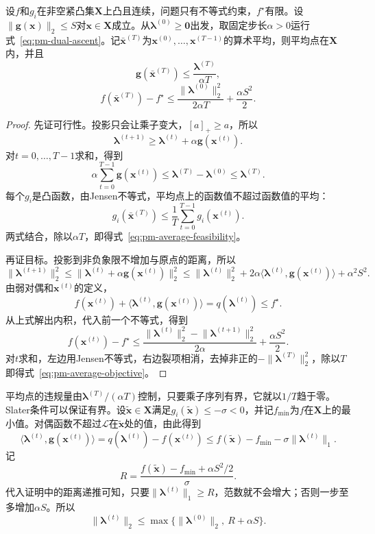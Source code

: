 \begin{theorem}[平均点的可行性与目标]
\label{thm:pm-primal-average}
设$f$和$g_i$在非空紧凸集$\bm{X}$上凸且连续，问题只有不等式约束，$f^\star$有限。设$\lVert\bm{g}(\bm{x})\rVert_2\leq S$对$\bm{x}\in\bm{X}$成立。从$\bm{\lambda}^{(0)}\geq\bm{0}$出发，取固定步长$\alpha>0$运行式~\eqref{eq:pm-dual-ascent}。记$\bar{\bm{x}}^{(T)}$为$\bm{x}^{(0)},\ldots,\bm{x}^{(T-1)}$的算术平均，则平均点在$\bm{X}$内，并且
\begin{equation}
 \bm{g}(\bar{\bm{x}}^{(T)})\leq\frac{\bm{\lambda}^{(T)}}{\alpha T},
 \label{eq:pm-average-feasibility}
\end{equation}
\begin{equation}
 f(\bar{\bm{x}}^{(T)})-f^\star\leq\frac{\lVert\bm{\lambda}^{(0)}\rVert_2^2}{2\alpha T}+\frac{\alpha S^2}{2}.
 \label{eq:pm-average-objective}
\end{equation}
\end{theorem}

\begin{proof}
先证可行性。投影只会让乘子变大，$[a]_+\geq a$，所以
\[
 \bm{\lambda}^{(t+1)}\geq\bm{\lambda}^{(t)}+\alpha\bm{g}(\bm{x}^{(t)}).
\]
对$t=0,\ldots,T-1$求和，得到
\[
 \alpha\sum_{t=0}^{T-1}\bm{g}(\bm{x}^{(t)})\leq\bm{\lambda}^{(T)}-\bm{\lambda}^{(0)}\leq\bm{\lambda}^{(T)}.
\]
每个$g_i$是凸函数，由Jensen不等式，平均点上的函数值不超过函数值的平均：
\[
 g_i(\bar{\bm{x}}^{(T)})\leq\frac1T\sum_{t=0}^{T-1}g_i(\bm{x}^{(t)}).
\]
两式结合，除以$\alpha T$，即得式~\eqref{eq:pm-average-feasibility}。

再证目标。投影到非负象限不增加与原点的距离，所以
\[
 \lVert\bm{\lambda}^{(t+1)}\rVert_2^2\leq\lVert\bm{\lambda}^{(t)}+\alpha\bm{g}(\bm{x}^{(t)})\rVert_2^2\leq\lVert\bm{\lambda}^{(t)}\rVert_2^2+2\alpha\langle\bm{\lambda}^{(t)},\bm{g}(\bm{x}^{(t)})\rangle+\alpha^2S^2 .
\]
由弱对偶和$\bm{x}^{(t)}$的定义，
\[
 f(\bm{x}^{(t)})+\langle\bm{\lambda}^{(t)},\bm{g}(\bm{x}^{(t)})\rangle=q(\bm{\lambda}^{(t)})\leq f^\star .
\]
从上式解出内积，代入前一个不等式，得到
\[
 f(\bm{x}^{(t)})-f^\star\leq\frac{\lVert\bm{\lambda}^{(t)}\rVert_2^2-\lVert\bm{\lambda}^{(t+1)}\rVert_2^2}{2\alpha}+\frac{\alpha S^2}{2}.
\]
对$t$求和，左边用Jensen不等式，右边裂项相消，去掉非正的$-\lVert\bm{\lambda}^{(T)}\rVert_2^2$，除以$T$即得式~\eqref{eq:pm-average-objective}。
\end{proof}

平均点的违规量由$\bm{\lambda}^{(T)}/(\alpha T)$控制，只要乘子序列有界，它就以$1/T$趋于零。Slater条件可以保证有界。设$\tilde{\bm{x}}\in\bm{X}$满足$g_i(\tilde{\bm{x}})\leq-\sigma<0$，并记$f_{\min}$为$f$在$\bm{X}$上的最小值。对偶函数不超过$\mathcal{L}$在$\tilde{\bm{x}}$处的值，由此得到
\[
 \langle\bm{\lambda}^{(t)},\bm{g}(\bm{x}^{(t)})\rangle=q(\bm{\lambda}^{(t)})-f(\bm{x}^{(t)})\leq f(\tilde{\bm{x}})-f_{\min}-\sigma\lVert\bm{\lambda}^{(t)}\rVert_1 .
\]
记
\[
 R=\frac{f(\tilde{\bm{x}})-f_{\min}+\alpha S^2/2}{\sigma}.
\]
代入证明中的距离递推可知，只要$\lVert\bm{\lambda}^{(t)}\rVert_1\geq R$，范数就不会增大；否则一步至多增加$\alpha S$。所以
\[
 \lVert\bm{\lambda}^{(t)}\rVert_2\leq\max\bigl\{\lVert\bm{\lambda}^{(0)}\rVert_2,\ R+\alpha S\bigr\}.
\]

